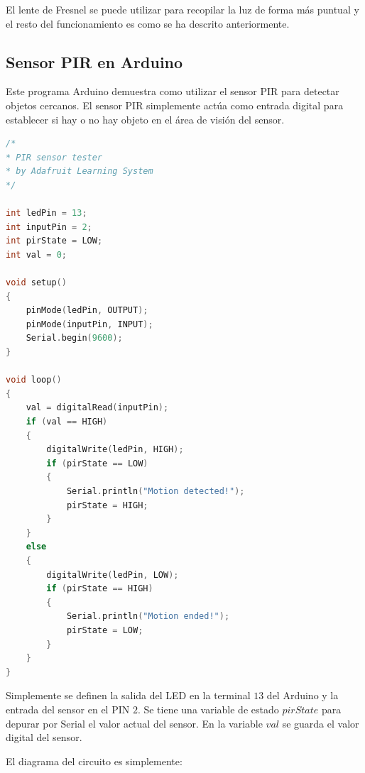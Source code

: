 \documentclass[conference]{IEEEtran}
\begin{document}
    El lente de Fresnel se puede utilizar para recopilar la luz de forma más puntual y el resto del funcionamiento es como se ha descrito anteriormente.

    \subsection{Sensor PIR en Arduino}

    Este programa Arduino demuestra como utilizar el sensor PIR para detectar objetos cercanos. El sensor PIR simplemente actúa como entrada digital para establecer si hay o no hay objeto en el área de visión del sensor.

    \begin{lstlisting}[language=C, caption=Sensor PIR en Arduino. Fuente: Adafruit Learning System $\mid$ PIR Motion Sensor \cite{adafruit-learning-system-pir-sensor-2014A}]
/*
* PIR sensor tester
* by Adafruit Learning System
*/

int ledPin = 13;
int inputPin = 2;
int pirState = LOW;
int val = 0;

void setup()
{
    pinMode(ledPin, OUTPUT);
    pinMode(inputPin, INPUT);
    Serial.begin(9600);
}

void loop()
{
    val = digitalRead(inputPin);
    if (val == HIGH)
    {
        digitalWrite(ledPin, HIGH);
        if (pirState == LOW)
        {
            Serial.println("Motion detected!");
            pirState = HIGH;
        }
    }
    else
    {
        digitalWrite(ledPin, LOW);
        if (pirState == HIGH)
        {
            Serial.println("Motion ended!");
            pirState = LOW;
        }
    }
}
\end{lstlisting}

\bigbreak

Simplemente se definen la salida del LED en la terminal $13$ del Arduino y la entrada del sensor en el PIN $2$. Se tiene una variable de estado $pirState$ para depurar por Serial el valor actual del sensor. En la variable $val$ se guarda el valor digital del sensor.

\bigbreak

El diagrama del circuito es simplemente:
\end{document}

